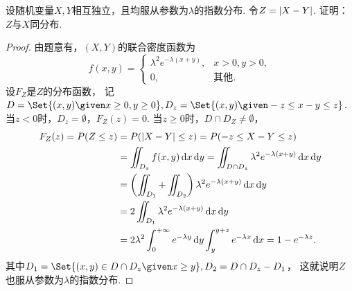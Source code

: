 \begin{example}
设随机变量\(X,Y\)相互独立，且均服从参数为\(\lambda\)的指数分布.
令\(Z=\abs{X-Y}\).
证明：\(Z\)与\(X\)同分布.
\begin{proof}
由题意有，\((X,Y)\)的联合密度函数为\begin{equation*}
	f(x,y) = \left\{ \begin{array}{cl}
		\lambda^2 e^{-\lambda (x+y)}, & x>0,y>0, \\
		0, & \text{其他}.
	\end{array} \right.
\end{equation*}
设\(F_Z\)是\(Z\)的分布函数，
记\(D = \Set{ (x,y) \given x\geq0,y\geq0 },
D_z = \Set{ (x,y) \given -z \leq x-y \leq z }\).
当\(z < 0\)时，\(D_z = \emptyset\)，\(F_Z(z) = 0\).
当\(z \geq 0\)时，\(D \cap D_Z \neq \emptyset\)，\begin{align*}
	F_Z(z) = P(Z \leq z)
	&= P(\abs{X-Y} \leq z)
	= P(-z \leq X-Y \leq z) \\
	&= \iint_{D_z} f(x,y) \dd{x}\dd{y}
	= \iint_{D \cap D_z} \lambda^2 e^{-\lambda (x+y)} \dd{x}\dd{y} \\
	&= \left( \iint_{D_1} + \iint_{D_2} \right) \lambda^2 e^{-\lambda (x+y)} \dd{x}\dd{y} \\
	&= 2 \iint_{D_1} \lambda^2 e^{-\lambda (x+y)} \dd{x}\dd{y} \\
	&= 2\lambda^2 \int_0^{+\infty} e^{-\lambda y} \dd{y}
	\int_y^{y+z} e^{-\lambda x} \dd{x}
	= 1 - e^{-\lambda z}.
\end{align*}
其中\(D_1 = \Set{ (x,y) \in D \cap D_z \given x \geq y },
D_2 = D \cap D_z - D_1\)，
这就说明\(Z\)也服从参数为\(\lambda\)的指数分布.
\end{proof}
\end{example}
